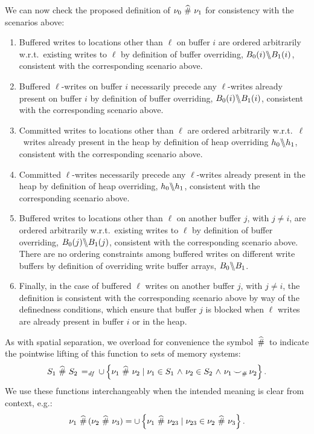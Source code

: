\documentclass[11pt]{report}         %
\begin{document}
We can now check the proposed definition of $\nu_0 \operatorname{\,\widehat{\#}\,} \nu_1$ for consistency with the scenarios above: \begin{enumerate}
  \item Buffered writes to locations other than $\ell$ on buffer $i$ are ordered arbitrarily w.r.t.\ existing writes to $\ell$ by definition of buffer overriding, $B_0(i) \backslash\!\!\backslash B_1(i)$, consistent with the corresponding scenario above.

  \item Buffered $\ell$-writes on buffer $i$ necessarily precede any $\ell$-writes already present on buffer $i$ by definition of buffer overriding, $B_0(i) \backslash\!\!\backslash B_1(i)$, consistent with the corresponding scenario above.

  \item Committed writes to locations other than $\ell$ are ordered arbitrarily w.r.t.\ $\ell$~writes already present in the heap by definition of heap overriding $h_0 \backslash\!\!\backslash h_1$, consistent with the corresponding scenario above. 
  
  \item Committed $\ell$-writes necessarily precede any $\ell$-writes already present in the heap by definition of heap overriding, $h_0 \backslash\!\!\backslash h_1$, consistent with the corresponding scenario above. 

  \item Buffered writes to locations other than $\ell$ on another buffer $j$, with $j \neq i$, are ordered arbitrarily w.r.t.\ existing writes to $\ell$ by definition of buffer overriding, $B_0(j) \backslash\!\!\backslash B_1(j)$, consistent with the corresponding scenario above. There are no ordering constraints among buffered writes on different write buffers by definition of overriding write buffer arrays, $B_0 \backslash\!\!\backslash B_1$. 
  
  \item Finally, in the case of buffered $\ell$ writes on another buffer $j$, with $j \neq i$, the definition is consistent with the corresponding scenario above by way of the definedness conditions, which ensure that buffer $j$ is blocked when $\ell$ writes are already present in buffer $i$ or in the heap. 
\end{enumerate}

As with spatial separation, we overload for convenience the symbol $\operatorname{\,\widehat{\#}\,}$ to indicate the pointwise lifting of this function to sets of memory systems: \[ S_1 \operatorname{\,\widehat{\#}\,} S_2 \operatorname{\;=_{\mathit{df}}\;} \cup \left\lbrace \nu_1 \operatorname{\,\widehat{\#}\,} \nu_2 \mid \nu_1 \in S_1 \operatorname{\,\wedge\,} \nu_2 \in S_2 \operatorname{\,\wedge\,} \nu_1 \operatorname{\smile}_\# \nu_2 \right\rbrace.\] We use these functions interchangeably when the intended meaning is clear from context, e.g.: \[ \nu_1 \operatorname{\,\widehat{\#}\,} (\nu_2 \operatorname{\,\widehat{\#}\,} \nu_3) = \cup \left\lbrace \nu_1 \operatorname{\,\widehat{\#}\,} \nu_{23} \mid \nu_{23} \in \nu_2 \operatorname{\,\widehat{\#}\,} \nu_3 \right\rbrace.\] 
\end{document}
